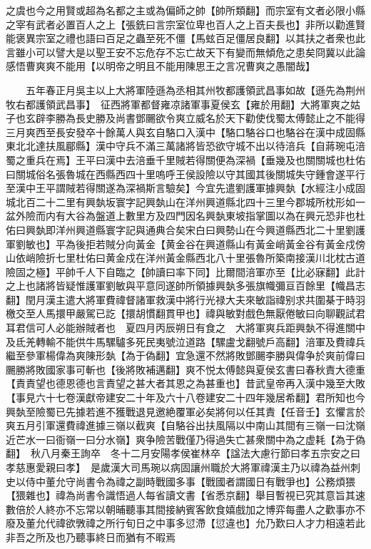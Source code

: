 之虞也今之用賢或超為名都之主或為偏師之帥【帥所類翻】而宗室有文者必限小縣之宰有武者必置百人之上【張銑曰言宗室位卑也百人之上百夫長也】非所以勸進賢能褒異宗室之禮也語曰百足之蟲至死不僵【馬蚿百足僵居良翻】以其扶之者衆也此言雖小可以譬大是以聖王安不忘危存不忘亡故天下有變而無傾危之患矣冏冀以此論感悟曹爽爽不能用【以明帝之明且不能用陳思王之言况曹爽之愚闇哉】

　　五年春正月吳主以上大將軍陸遜為丞相其州牧都護領武昌事如故【遜先為荆州牧右都護領武昌事】　征西將軍都督雍凉諸軍事夏侯玄【雍於用翻】大將軍爽之姑子也玄辟李勝為長史勝及尚書鄧颺欲令爽立威名於天下勸使伐蜀太傅懿止之不能得三月爽西至長安發卒十餘萬人與玄自駱口入漢中【駱口駱谷口也駱谷在漢中成固縣東北北達扶風郿縣】漢中守兵不滿三萬諸將皆恐欲守城不出以待涪兵【自蔣琬屯涪蜀之重兵在焉】王平曰漢中去涪垂千里賊若得關便為深禍【垂幾及也關關城也杜佑曰關城俗名張魯城在西縣西四十里嗚呼王侯設險以守其國其後關城失守鍾會遂平行至漢中王平謂賊若得關遂為深禍斯言驗矣】今宜先遣劉護軍據興埶【水經注小成固城北百二十二里有興埶坂寰字記興埶山在洋州興道縣北四十三里今郡城所枕形如一盆外險而内有大谷為盤道上數里方及四門因名興埶東坡指掌圖以為在興元恐非也杜佑曰興埶即洋州興道縣寰字記與通典合矣宋白曰興勢山在今興道縣西北二十里劉護軍劉敏也】平為後拒若賊分向黃金【黄金谷在興道縣山有黃金峭黃金谷有黃金戍傍山依峭險折七里杜佑曰黄金戍在洋州黃金縣西北八十里張魯所築南接漢川北枕古道險固之極】平帥千人下自臨之【帥讀曰率下同】比爾間涪軍亦至【比必寐翻】此計之上也諸將皆疑惟護軍劉敏與平意同遂帥所領據興埶多張旗幟彌亘百餘里【幟昌志翻】閏月漢主遣大將軍費禕督諸軍救漢中將行光禄大夫來敏詣禕别求共圍棊于時羽檄交至人馬擐甲嚴駕已訖【擐胡慣翻貫甲也】禕與敏對戲色無厭倦敏曰向聊觀試君耳君信可人必能辦賊者也　夏四月丙辰朔日有食之　大將軍爽兵距興埶不得進關中及氐羌轉輸不能供牛馬騾驢多死民夷號泣道路【騾盧戈翻號戶高翻】涪軍及費禕兵繼至參軍楊偉為爽陳形埶【為于偽翻】宜急還不然將敗鄧颺李勝與偉争於爽前偉曰颺勝將敗國家事可斬也【後將敗補邁翻】爽不悦太傅懿與夏侯玄書曰春秋責大德重【責責望也德恩德也言責望之甚大者其恩之為甚重也】昔武皇帝再入漢中幾至大敗【事見六十七卷漢獻帝建安二十年及六十八卷建安二十四年幾居希翻】君所知也今興埶至險蜀已先據若進不獲戰退見邀絶覆軍必矣將何以任其責【任音壬】玄懼言於爽五月引軍還費禕進據三嶺以截爽【自駱谷出扶風隔以中南山其間有三嶺一曰沈嶺近芒水一曰衙嶺一曰分水嶺】爽争險苦戰僅乃得過失亡甚衆關中為之虚耗【為于偽翻】　秋八月秦王詢卒　冬十二月安陽孝侯崔林卒【諡法大慮行節曰孝五宗安之曰孝慈惠愛親曰孝】　是歲漢大司馬琬以病固讓州職於大將軍禕漢主乃以禕為益州刺史以侍中董允守尚書令為禕之副時戰國多事【戰國者謂國日有戰爭也】公務煩猥【猥雜也】禕為尚書令識悟過人每省讀文書【省悉京翻】舉目暫視已究其意旨其速數倍於人終亦不忘常以朝晡聽事其間接納賓客飲食嬉戲加之博弈每盡人之歡事亦不廢及董允代禕欲斆禕之所行旬日之中事多愆滯【愆違也】允乃歎曰人才力相遠若此非吾之所及也乃聽事終日而猶有不暇焉

